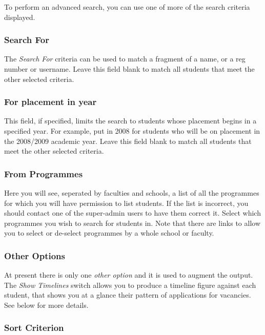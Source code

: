 \documentclass[12 pt]{book}
\begin{document}
To perform an advanced search, you can use one of more of the search criteria
displayed.


\subsubsection{Search For}

The \emph{Search For} criteria can be used to match a fragment of a name, or a
reg number or username. Leave this field blank to match all students that meet
the other selected criteria.

\subsubsection{For placement in year}

This field, if specified, limits the search to students whose placement begins
in a specified year. For example, put in 2008 for students who will be on
placement in the 2008/2009 academic year. Leave this field blank to match all
students that meet the other selected criteria.

\subsubsection{From Programmes}

Here you will see, seperated by faculties and schools, a list of all the
programmes for which you will have permission to list students. If the list
is incorrect, you should contact one of the super-admin users to have them
correct it. Select which programmes you wish to search for students in. Note
that there are links to allow you to select or de-select programmes by a whole
school or faculty.

\subsubsection{Other Options}

At present there is only one \emph{other option} and it is used to augment the
output. The \emph{Show Timelines} switch allows you to produce a timeline
figure against each student, that shows you at a glance their pattern of
applications for vacancies. See below for more details.

\subsubsection{Sort Criterion}
\end{document}
